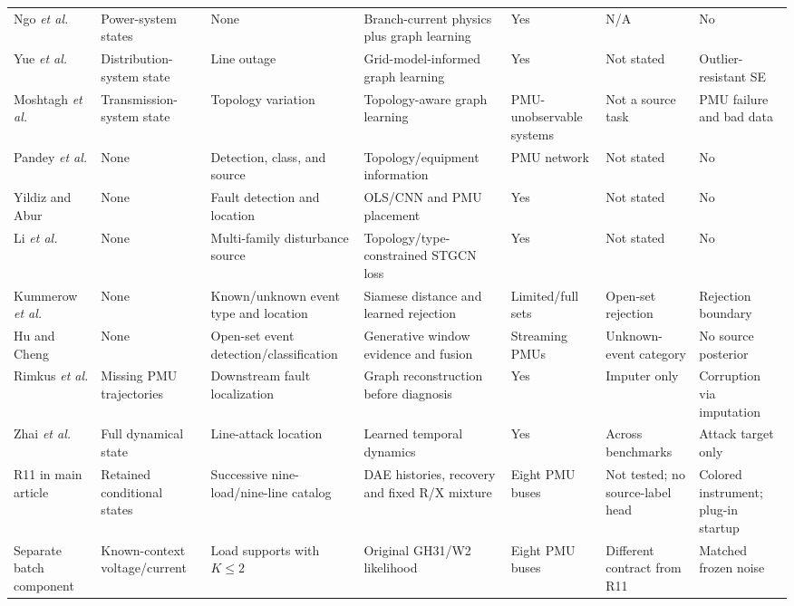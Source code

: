 \documentclass{ieeeaccess}
\begin{document}
\begin{table}[t]
\begin{tabularx}{\textwidth}{@{}lXXXXXX@{}}
Ngo \emph{et al.} \cite{ngo2024pignn} & Power-system states & None & Branch-current physics plus graph learning & Yes & N/A & No \\
Yue \emph{et al.} \cite{yue2024graph} & Distribution-system state & Line outage & Grid-model-informed graph learning & Yes & Not stated & Outlier-resistant SE \\
Moshtagh \emph{et al.} \cite{moshtagh2025topology} & Transmission-system state & Topology variation & Topology-aware graph learning & PMU-unobservable systems & Not a source task & PMU failure and bad data \\
Pandey \emph{et al.} \cite{pandey2020realtime} & None & Detection, class, and source & Topology/equipment information & PMU network & Not stated & No \\
Yildiz and Abur \cite{yildiz2024few} & None & Fault detection and location & OLS/CNN and PMU placement & Yes & Not stated & No \\
Li \emph{et al.} \cite{li2024knowledge} & None & Multi-family disturbance source & Topology/type-constrained STGCN loss & Yes & Not stated & No \\
Kummerow \emph{et al.} \cite{kummerow2023sigmoid} & None & Known/unknown event type and location & Siamese distance and learned rejection & Limited/full sets & Open-set rejection & Rejection boundary \\
Hu and Cheng \cite{hu2026openset} & None & Open-set event detection/classification & Generative window evidence and fusion & Streaming PMUs & Unknown-event category & No source posterior \\
Rimkus \emph{et al.} \cite{rimkus2025gnn} & Missing PMU trajectories & Downstream fault localization & Graph reconstruction before diagnosis & Yes & Imputer only & Corruption via imputation \\
Zhai \emph{et al.} \cite{zhai2025partial} & Full dynamical state & Line-attack location & Learned temporal dynamics & Yes & Across benchmarks & Attack target only \\
R11 in main article & Retained conditional states & Successive nine-load/nine-line catalog & DAE histories, recovery and fixed R/X mixture & Eight PMU buses & Not tested; no source-label head & Colored instrument; plug-in startup \\
Separate batch component & Known-context voltage/current & Load supports with $K\le2$ & Original GH31/W2 likelihood & Eight PMU buses & Different contract from R11 & Matched frozen noise \\
\bottomrule
\end{tabularx}
\end{table}
\end{document}
